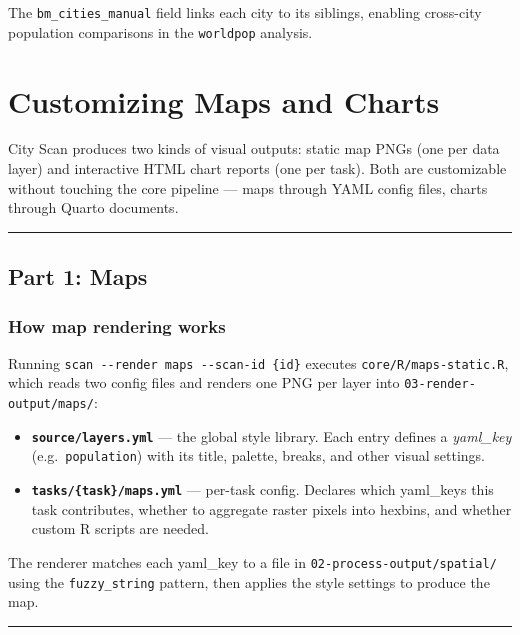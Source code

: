 \documentclass[
  letterpaper,
  DIV=11,
  numbers=noendperiod]{scrreprt}
\providecommand{\tightlist}{%
  \setlength{\itemsep}{0pt}\setlength{\parskip}{0pt}}
\begin{document}
The \texttt{bm\_cities\_manual} field links each city to its siblings,
enabling cross-city population comparisons in the \texttt{worldpop}
analysis.

\chapter{Customizing Maps and Charts}\label{customizing-maps-and-charts}

City Scan produces two kinds of visual outputs: static map PNGs (one per
data layer) and interactive HTML chart reports (one per task). Both are
customizable without touching the core pipeline --- maps through YAML
config files, charts through Quarto documents.

\begin{center}\rule{0.5\linewidth}{0.5pt}\end{center}

\section{Part 1: Maps}\label{part-1-maps}

\subsection{How map rendering works}\label{how-map-rendering-works}

Running \texttt{scan\ -\/-render\ maps\ -\/-scan-id\ \{id\}} executes
\texttt{core/R/maps-static.R}, which reads two config files and renders
one PNG per layer into \texttt{03-render-output/maps/}:

\begin{itemize}
\tightlist
\item
  \textbf{\texttt{source/layers.yml}} --- the global style library. Each
  entry defines a \emph{yaml\_key} (e.g.~\texttt{population}) with its
  title, palette, breaks, and other visual settings.
\item
  \textbf{\texttt{tasks/\{task\}/maps.yml}} --- per-task config.
  Declares which yaml\_keys this task contributes, whether to aggregate
  raster pixels into hexbins, and whether custom R scripts are needed.
\end{itemize}

The renderer matches each yaml\_key to a file in
\texttt{02-process-output/spatial/} using the \texttt{fuzzy\_string}
pattern, then applies the style settings to produce the map.

\begin{center}\rule{0.5\linewidth}{0.5pt}\end{center}
\end{document}
